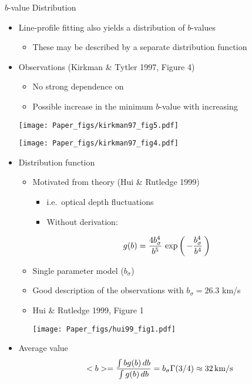 \documentclass[12pt,letterpaper]{article}
\begin{document}
\begin{Aenumerate}
\begin{itemize}
	\end{itemize}

{\bf \item $b$-value Distribution}
	\begin{itemize}
	\item Line-profile fitting also yields a distribution of $b$-values
		\begin{itemize}
		\item These may be described by a separate distribution function
		\end{itemize}
	\item Observations (Kirkman \& Tytler 1997, Figure 4)
		\begin{itemize}
		\item No strong dependence on \nhi
		\item Possible increase in the minimum $b$-value with increasing \nhi
		\end{itemize}

	\texttt{[image: Paper\_figs/kirkman97\_fig5.pdf]}

	\texttt{[image: Paper\_figs/kirkman97\_fig4.pdf]}

	\item Distribution function
		\begin{itemize}
		\item Motivated from theory (Hui \& Rutledge 1999)
			\begin{itemize}
			\item i.e.\ optical depth fluctuations
			\item Without derivation:
			\end{itemize}
		\begin{equation}
		g(b) = \frac{4 b_\sigma^4}{b^5} \, \exp \left ( \, - \frac{b_\sigma^4}{b^4} \, \right )
		\end{equation}
		\item Single parameter model ($b_\sigma$)
		\item Good description of the observations with $b_\sigma = 26.3$ km/s
		\item Hui \& Rutledge 1999, Figure 1

	\texttt{[image: Paper\_figs/hui99\_fig1.pdf]}

		\end{itemize}

	\item Average value
	\begin{equation}
	<b> = \frac{\int b g(b) \, db}{\int g(b) \, db} = b_\sigma \Gamma(3/4)
	\approx 32 \, {\rm km/s}
	\end{equation}


\end{itemize}
\end{Aenumerate}
\end{document}
